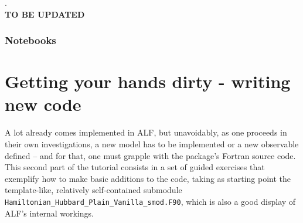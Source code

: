 \documentclass[10pt,modern]{scrartcl}
\numberwithin{exerciseitem}{exercise} %
\begin{document}


.\\
\textbf{TO BE UPDATED}\\

\section*{Notebooks}












\newpage

\part{Getting your hands dirty - writing new code}

A lot already comes implemented in ALF, but unavoidably, as one proceeds in their own investigations, a new model has to be implemented or a new observable defined -- and for that, one must grapple with the package's Fortran source code. 
This second part of the tutorial consists in a set of guided exercises that exemplify how to make basic additions to the code, taking as starting point the template-like, relatively self-contained submodule \texttt{Hamiltonian\_Hubbard\_Plain\_Vanilla\_smod.F90}, which is also a good display of ALF's internal workings.
\end{document}
